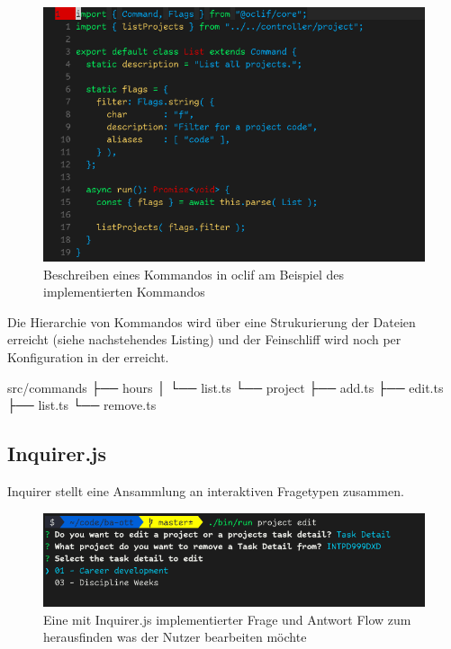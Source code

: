 \documentclass[oneside,bibliography=totocnumbered,BCOR=5mm]{scrbook}
\newenvironment{code}{\captionsetup{type=listing, skip=0pt}}{}
\begin{document}
\begin{figure}
  \centering
  \includegraphics[scale=0.5]{oclif-list.png}
  \caption{Beschreiben eines Kommandos in oclif am Beispiel des implementierten  Kommandos}
  \label{fig:oclif-list}
\end{figure}

Die Hierarchie von Kommandos wird über eine Strukurierung der Dateien erreicht (siehe nachstehendes Listing) und der Feinschliff wird noch per Konfiguration in der  erreicht.

\begin{code}
  \begin{shellcode}
 src/commands
 ├── hours
 │   └── list.ts
 └── project
     ├── add.ts
     ├── edit.ts
     ├── list.ts
     └── remove.ts
  \end{shellcode}
  \medskip
\end{code}


\subsection{Inquirer.js}

Inquirer stellt eine Ansammlung an interaktiven %
Fragetypen zusammen.

\begin{figure}
  \centering
  \includegraphics[scale=0.5]{inquirer-example.png}
  \caption{Eine mit Inquirer.js implementierter Frage und Antwort Flow zum herausfinden was der Nutzer bearbeiten möchte}
  \label{fig:inquirer-example}
\end{figure}
\end{document}
